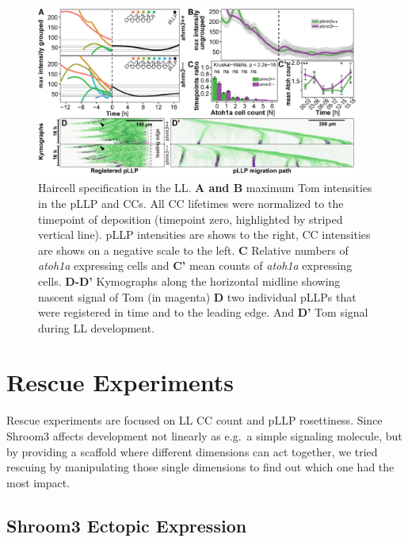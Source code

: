 \documentclass[11pt,singlespacinge,twoside]{reedthesis} %
\begin{document}
\begin{figure}

{\centering \includegraphics[width=0.95\textwidth]{figures/results/05_atoh/Figure_7-white-01} 

}

\caption[Haircell specification in the LL]{Haircell specification in the LL. \textbf{A and B} maximum Tom intensities in the pLLP and CCs. All CC lifetimes were normalized to the timepoint of deposition (timepoint zero, highlighted by striped vertical line). pLLP intensities are shows to the right, CC intensities are shows on a negative scale to the left. \textbf{C} Relative numbers of \emph{atoh1a} expressing cells and \textbf{C'} mean counts of \emph{atoh1a} expressing cells. \textbf{D-D'} Kymographs along the horizontal midline showing nascent signal of Tom (in magenta) \textbf{D} two individual pLLPs that were registered in time and to the leading edge. And \textbf{D'} Tom signal during LL development.}\label{fig:hctl}
\end{figure}
\hypertarget{rescue-experiments}{%
\section{Rescue Experiments}\label{rescue-experiments}}

Rescue experiments are focused on LL CC count and pLLP rosettiness. Since Shroom3 affects development not linearly as e.g.~a simple signaling molecule, but by providing a scaffold where different dimensions can act together, we tried rescuing by manipulating those single dimensions to find out which one had the most impact.

\hypertarget{res-shrmresc}{%
\subsection{Shroom3 Ectopic Expression}\label{res-shrmresc}}
\end{document}
